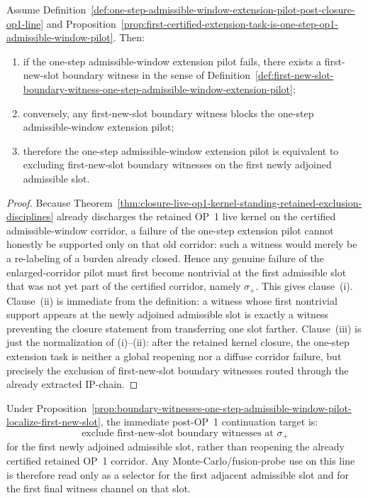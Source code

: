 \begin{proposition}
\label{prop:boundary-witnesses-one-step-admissible-window-pilot-localize-first-new-slot}
Assume Definition~\ref{def:one-step-admissible-window-extension-pilot-post-closure-op1-line} and Proposition~\ref{prop:first-certified-extension-task-is-one-step-op1-admissible-window-pilot}. Then:
\begin{enumerate}[leftmargin=2em,label=(\roman*)]
 \item if the one-step admissible-window extension pilot fails, there exists a first-new-slot boundary witness in the sense of Definition~\ref{def:first-new-slot-boundary-witness-one-step-admissible-window-extension-pilot};
 \item conversely, any first-new-slot boundary witness blocks the one-step admissible-window extension pilot;
 \item therefore the one-step admissible-window extension pilot is equivalent to excluding first-new-slot boundary witnesses on the first newly adjoined admissible slot.
\end{enumerate}
\end{proposition}

\begin{proof}
Because Theorem~\ref{thm:closure-live-op1-kernel-standing-retained-exclusion-disciplines} already discharges the retained OP~1 live kernel on the certified admissible-window corridor, a failure of the one-step extension pilot cannot honestly be supported only on that old corridor: such a witness would merely be a re-labeling of a burden already closed. Hence any genuine failure of the enlarged-corridor pilot must first become nontrivial at the first admissible slot that was not yet part of the certified corridor, namely $\sigma_{+}$. This gives clause~(i). Clause~(ii) is immediate from the definition: a witness whose first nontrivial support appears at the newly adjoined admissible slot is exactly a witness preventing the closure statement from transferring one slot farther. Clause~(iii) is just the normalization of (i)--(ii): after the retained kernel closure, the one-step extension task is neither a global reopening nor a diffuse corridor failure, but precisely the exclusion of first-new-slot boundary witnesses routed through the already extracted IP-chain.
\end{proof}

\begin{corollary}
\label{cor:normalized-immediate-target-one-step-op1-extension-pilot}
Under Proposition~\ref{prop:boundary-witnesses-one-step-admissible-window-pilot-localize-first-new-slot}, the immediate post-OP~1 continuation target is:
\[
\text{exclude first-new-slot boundary witnesses at } \sigma_{+}
\]
for the first newly adjoined admissible slot, rather than reopening the already certified retained OP~1 corridor. Any Monte-Carlo/fusion-probe use on this line is therefore read only as a selector for the first adjacent admissible slot and for the first final witness channel on that slot.
\end{corollary}

